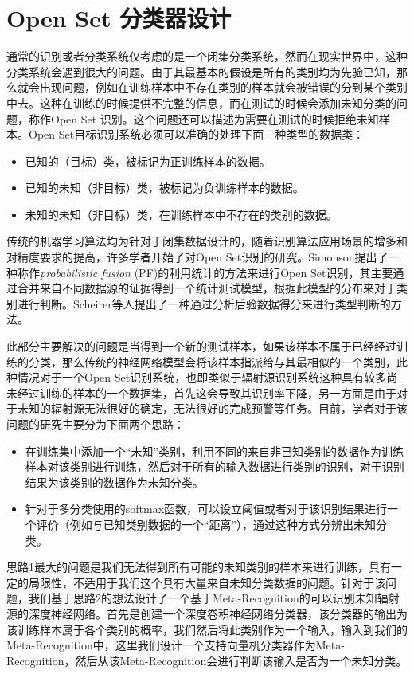 \section{Open Set 分类器设计}
通常的识别或者分类系统仅考虑的是一个闭集分类系统，然而在现实世界中，这种分类系统会遇到很大的问题。由于其最基本的假设是所有的类别均为先验已知，那么就会出现问题，例如在训练样本中不存在类别的样本就会被错误的分到某个类别中去。这种在训练的时候提供不完整的信息，而在测试的时候会添加未知分类的问题，称作Open Set 识别\cite{scheirer2013toward, jain2014multi}。这个问题还可以描述为需要在测试的时候拒绝未知样本。Open Set目标识别系统必须可以准确的处理下面三种类型的数据类：
\begin{itemize}
	\item 已知的（目标）类，被标记为正训练样本的数据。
	\item 已知的未知（非目标）类，被标记为负训练样本的数据。
	\item 未知的未知（非目标）类，在训练样本中不存在的类别的数据。
\end{itemize}
传统的机器学习算法均为针对于闭集数据设计的，随着识别算法应用场景的增多和对精度要求的提高，许多学者开始了对Open Set识别的研究。Simonson\cite{simonson1998probabilistic}提出了一种称作\textit{probabilistic fusion} (PF)的利用统计的方法来进行Open Set识别，其主要通过合并来自不同数据源的证据得到一个统计测试模型，根据此模型的分布来对于类别进行判断。Scheirer等人\cite{scheirer2011meta}提出了一种通过分析后验数据得分来进行类型判断的方法。

此部分主要解决的问题是当得到一个新的测试样本，如果该样本不属于已经经过训练的分类，那么传统的神经网络模型会将该样本指派给与其最相似的一个类别，此种情况对于一个Open Set识别系统，也即类似于辐射源识别系统这种具有较多尚未经过训练的样本的一个数据集，首先这会导致其识别率下降，另一方面是由于对于未知的辐射源无法很好的确定，无法很好的完成预警等任务。目前，学者对于该问题的研究主要分为下面两个思路：
\begin{itemize}
	\item 在训练集中添加一个“未知”类别，利用不同的来自非已知类别的数据作为训练样本对该类别进行训练，然后对于所有的输入数据进行类别的识别，对于识别结果为该类别的数据作为未知分类。
	\item 针对于多分类使用的softmax函数，可以设立阈值或者对于该识别结果进行一个评价（例如与已知类别数据的一个“距离”），通过这种方式分辨出未知分类。
\end{itemize}
思路1最大的问题是我们无法得到所有可能的未知类别的样本来进行训练，具有一定的局限性，不适用于我们这个具有大量来自未知分类数据的问题。针对于该问题，我们基于思路2的想法设计了一个基于Meta-Recognition的可以识别未知辐射源的深度神经网络。首先是创建一个深度卷积神经网络分类器，该分类器的输出为该训练样本属于各个类别的概率，我们然后将此类别作为一个输入，输入到我们的Meta-Recognition中，这里我们设计一个支持向量机分类器作为Meta-Recognition，然后从该Meta-Recognition会进行判断该输入是否为一个未知分类。

